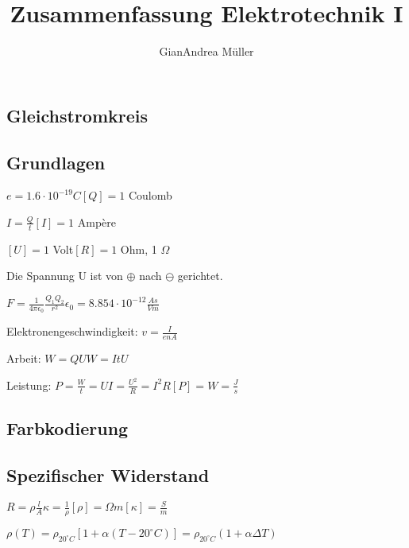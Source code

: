 \documentclass[10pt,a4paper]{scrartcl}
\author{GianAndrea Müller}
\title{Zusammenfassung Elektrotechnik I}
\begin{document}
\begin{multicols*}{3}	%
	\parindent 0pt %
	\setlength{\columnseprule}{0.5pt}	%

	\section{Gleichstromkreis}
	
	\subsection{Grundlagen}

	$e=1.6\cdot 10^{-19} C$\hfill$[Q]=1$ Coulomb
	
	$I=\frac{Q}{t}$\hfill$[I]=1$ Ampère
	
	$[U]=1$ Volt\hfill$[R]=1$ Ohm, 1 $\Omega$
	
	Die Spannung U ist von $\oplus$ nach $\ominus$ gerichtet. 
	
	\finn
	
	$F=\frac{1}{4\pi\epsilon_0}\frac{Q_1Q_2}{r^2}$\hfill$\epsilon_0=8.854\cdot 10^{-12}\frac{As}{Vm}$
	
	Elektronengeschwindigkeit: $v=\frac{I}{enA}$
	
	\finn
	
	Arbeit: $W = QU$\hfill$W = ItU$
	
	Leistung: $P=\frac{W}{t}=UI=\frac{U^2}{R}=I^2 R$\hfill$[P]=W=\frac{J}{s}$

	\subsection{Farbkodierung}	
	
	
	
	\subsection{Spezifischer Widerstand}
	
	$R = \rho \frac{l}{A}$\hfill$\kappa = \frac{1}{\rho}$\hfill$[\rho]=\Omega m$\hfill$[\kappa]=\frac{S}{m}$
	
	$\rho(T)=\rho_{20^\circ C}[1+\alpha(T-20^\circ C)]=\rho_{20^\circ C}(1+\alpha\Delta T)$
	

\end{multicols*}
\end{document}
